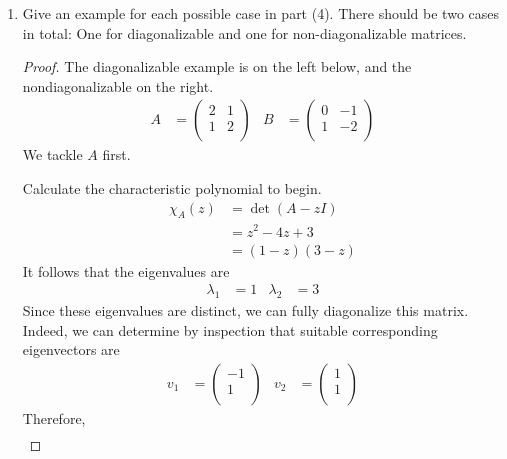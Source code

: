 \documentclass[../psets.tex]{subfiles}
\begin{document}
\begin{enumerate}
    \item Give an example for each possible case in part (4). There should be two cases in total: One for diagonalizable and one for non-diagonalizable matrices.
    \begin{proof}
        The diagonalizable example is on the left below, and the nondiagonalizable on the right.
        \begin{align*}
            A &=
            \begin{pmatrix}
                2 & 1\\
                1 & 2\\
            \end{pmatrix}&
            B &=
            \begin{pmatrix}
                0 & -1\\
                1 & -2\\
            \end{pmatrix}
        \end{align*}
        We tackle $A$ first.\par
        Calculate the characteristic polynomial to begin.
        \begin{align*}
            \chi_A(z) &= \det(A-zI)\\
            &= z^2-4z+3\\
            &= (1-z)(3-z)
        \end{align*}
        It follows that the eigenvalues are
        \begin{align*}
            \lambda_1 &= 1&
            \lambda_2 &= 3
        \end{align*}
        Since these eigenvalues are distinct, we can fully diagonalize this matrix. Indeed, we can determine by inspection that suitable corresponding eigenvectors are
        \begin{align*}
            v_1 &=
            \begin{pmatrix}
                -1\\
                1\\
            \end{pmatrix}&
            v_2 &=
            \begin{pmatrix}
                1\\
                1\\
            \end{pmatrix}
        \end{align*}
        Therefore,
        \begin{align*}

\end{align*}
\end{proof}
\end{enumerate}
\end{document}
